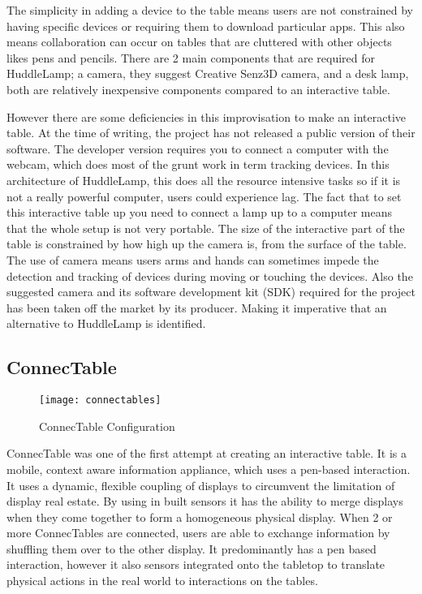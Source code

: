 The simplicity in adding a device to the table means users are not
constrained by having specific devices or requiring them to download
particular apps. This also means collaboration can occur on tables
that are cluttered with other objects likes pens and pencils. There
are 2 main components that are required for HuddleLamp;
a camera, they suggest Creative Senz3D camera, and a desk lamp, both
are relatively inexpensive components compared to an interactive table.

However there are some deficiencies in this improvisation to make
an interactive table. At the time of writing, the project has not
released a public version of their software. The developer
version requires you to connect a computer with the webcam, which
does most of the grunt work in term tracking devices. In this architecture
of HuddleLamp, this does all the resource intensive tasks so if it is
not a really powerful computer, users could experience lag. The fact
that to set this interactive table up you need to connect a lamp up
to a computer means that the whole setup is not very portable. The
size of the interactive part of the table is constrained by how high
up the camera is, from the surface of the table. The use of camera
means users arms and hands can sometimes impede the
detection and tracking of devices during moving or touching the devices.
Also the suggested camera and its software development kit (SDK) required
for the project has been taken off the market by its producer. Making
it imperative that an alternative to HuddleLamp is identified.


\subsection{ConnecTable}

\begin{figure}[H]
\texttt{[image: connectables]}

\protect\caption{ConnecTable Configuration}
\end{figure}


ConnecTable\cite{connectables} was one of the first attempt at creating
an interactive table. It is a mobile, context aware
information appliance, which uses a pen-based interaction. It uses
a dynamic, flexible coupling of displays to circumvent the limitation
of display real estate. By using in built sensors it has the ability
to merge displays when they come together to form a homogeneous physical
display. When 2 or more ConnecTables are connected, users are able
to exchange information by shuffling them over to the other display.
It predominantly has a pen based interaction, however it also sensors
integrated onto the tabletop to translate physical actions in the
real world to interactions on the tables. 

